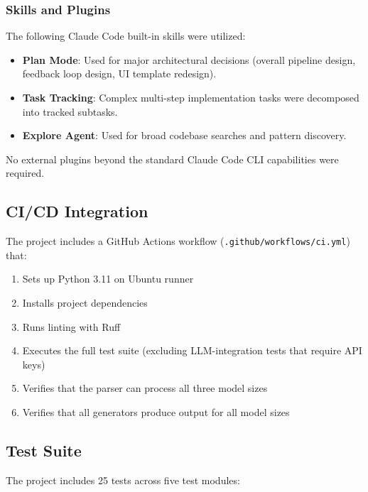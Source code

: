 \documentclass[11pt,a4paper]{article}
\begin{document}
\subsubsection{Skills and Plugins}

The following Claude Code built-in skills were utilized:

\begin{itemize}
    \item \textbf{Plan Mode}: Used for major architectural decisions (overall pipeline design, feedback loop design, UI template redesign).
    \item \textbf{Task Tracking}: Complex multi-step implementation tasks were decomposed into tracked subtasks.
    \item \textbf{Explore Agent}: Used for broad codebase searches and pattern discovery.
\end{itemize}

No external plugins beyond the standard Claude Code CLI capabilities were required.

\subsection{CI/CD Integration}

The project includes a GitHub Actions workflow ({\lstinline|.github/workflows/ci.yml|}) that:

\begin{enumerate}[leftmargin=*]
    \item Sets up Python 3.11 on Ubuntu runner
    \item Installs project dependencies
    \item Runs linting with Ruff
    \item Executes the full test suite (excluding LLM-integration tests that require API keys)
    \item Verifies that the parser can process all three model sizes
    \item Verifies that all generators produce output for all model sizes
\end{enumerate}

\subsection{Test Suite}

The project includes 25 tests across five test modules:
\end{document}
